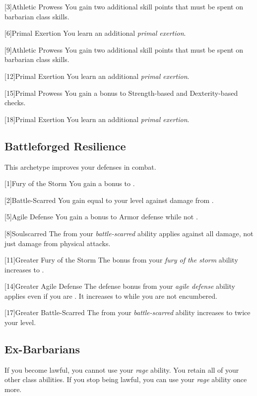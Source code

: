         [3]{Athletic Prowess} You gain two additional skill points that must be spent on barbarian class skills.

        [6]{Primal Exertion}
        You learn an additional \textit{primal exertion}.

        [9]{Athletic Prowess} You gain two additional skill points that must be spent on barbarian class skills.

        [12]{Primal Exertion}
        You learn an additional \textit{primal exertion}.

        [15]{Primal Prowess}
        You gain a  bonus to Strength-based and Dexterity-based checks.

        [18]{Primal Exertion}
        You learn an additional \textit{primal exertion}.

    \subsection{Battleforged Resilience}
        This archetype improves your defenses in combat.

        [1]{Fury of the Storm} You gain a  bonus to .

        [2]{Battle-Scarred} You gain  equal to your level against damage from .

        [5]{Agile Defense} You gain a  bonus to Armor defense while not .

        [8]{Soulscarred} The  from your \textit{battle-scarred} ability applies against all damage, not just damage from physical attacks.

        [11]{Greater Fury of the Storm}
        The bonus from your \textit{fury of the storm} ability increases to .

        [14]{Greater Agile Defense}
        The defense bonus from your \textit{agile defense} ability applies even if you are .
        It increases to  while you are not encumbered.

        [17]{Greater Battle-Scarred}
        The  from your \textit{battle-scarred} ability increases to twice your level.

    \subsection{Ex-Barbarians}
        If you become lawful, you cannot use your \textit{rage} ability.
        You retain all of your other class abilities.
        If you stop being lawful, you can use your \textit{rage} ability once more.

